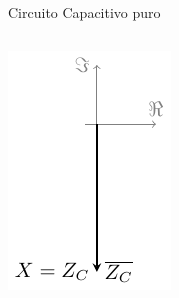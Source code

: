 \documentclass[aspectratio=169, usenames,svgnames,dvipsnames]{beamer}
\begin{document}
\begin{frame}[label={sec:orgf120d7a}]{Circuito Capacitivo puro}
\begin{columns}
\begin{column}{0.3\columnwidth}
\begin{center}
\includegraphics[height=0.4\textheight]{../figs/fasorCondensador.pdf}
\end{center}
\end{column}
\end{columns}
\end{frame}
\end{document}
